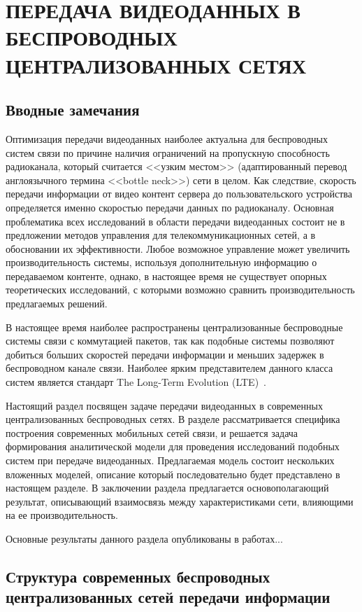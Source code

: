 \chapter{ПЕРЕДАЧА ВИДЕОДАННЫХ В БЕСПРОВОДНЫХ ЦЕНТРАЛИЗОВАННЫХ СЕТЯХ}
\label{chap2}

\section{Вводные замечания}
\label{chap2:Intro}

Оптимизация передачи видеоданных наиболее актуальна для беспроводных систем связи по причине наличия ограничений на пропускную способность радиоканала, который считается <<узким местом>> (адаптированный перевод англоязычного термина <<bottle neck>>) сети в целом. Как следствие, скорость передачи информации от видео контент сервера до пользовательского устройства определяется именно скоростью передачи данных по радиоканалу. Основная проблематика всех исследований в области передачи видеоданных состоит не в предложении методов управления для телекоммуникационных сетей, а в обосновании их эффективности. Любое возможное управление может увеличить производительность системы, используя дополнительную информацию о передаваемом контенте, однако, в настоящее время не существует опорных теоретических исследований, с которыми возможно сравнить производительность предлагаемых решений.

В настоящее время наиболее распространены централизованные беспроводные системы связи с коммутацией пакетов, так как подобные системы позволяют добиться больших скоростей передачи информации и меньших задержек в беспроводном канале связи. Наиболее ярким представителем данного класса систем является стандарт The Long-Term Evolution (LTE)~\cite{opac-b1130916}.

Настоящий раздел посвящен задаче передачи видеоданных в современных централизованных беспроводных сетях. В разделе рассматривается специфика построения современных мобильных сетей связи, и решается задача формирования аналитической модели для проведения исследований подобных систем при передаче видеоданных. Предлагаемая модель состоит нескольких вложенных моделей, описание который последовательно будет представлено в настоящем разделе. В заключении раздела предлагается основополагающий результат, описывающий взаимосвязь между характеристиками сети, влияющими на ее производительность.

Основные результаты данного раздела опубликованы в работах...

\section{Структура современных беспроводных централизованных сетей передачи информации}
\label{chap2:WirelessSystemStructure}

